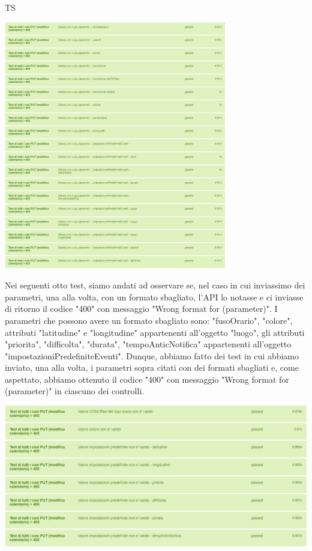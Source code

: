 \begin{listaPersonale}{TS}
\begin{center}
                        \includegraphics[width=0.73\textwidth, height=0.48\textheight]{img/png/tests/CalendarioPut/400_missingParameter_PutCalendario.png}
                \end{center}
                Nei seguenti otto test, siamo andati ad osservare se, nel caso in cui inviassimo dei parametri, una alla volta, con un formato sbagliato, l'API lo notasse e ci inviasse di ritorno il codice "400" con messaggio  "Wrong format for (parameter)". I parametri che possono avere un formato sbagliato sono: "fusoOrario", "colore", attributi "latitudine" e "longitudine" appartenenti all'oggetto "luogo", gli attributi "priorita", "difficolta", "durata", "tempoAnticNotifica" appartenenti all'oggetto "impostazioniPredefiniteEventi". Dunque, abbiamo fatto dei test in cui abbiamo inviato, una alla volta, i parametri sopra citati con dei formati sbagliati e, come aspettato, abbiamo ottenuto il codice "400" con messaggio "Wrong format for (parameter)" in ciascuno dei controlli.
                \begin{center}
                        \includegraphics[width=1\textwidth, height=0.28\textheight]{img/png/tests/CalendarioPut/400_wrongFormat_PutCalendario.png}

\end{center}
\end{listaPersonale}
